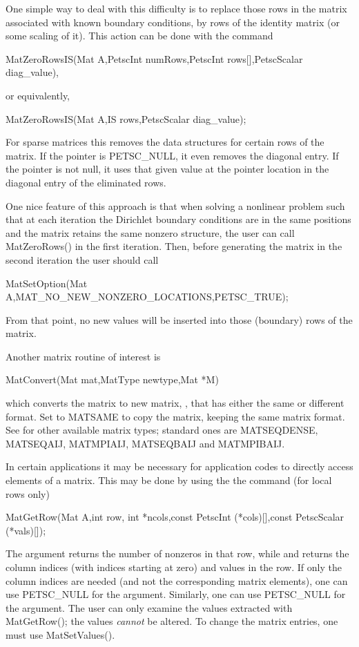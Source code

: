 One simple way to deal with this difficulty is to replace those rows in the 
matrix associated with known boundary conditions, by rows of the 
identity matrix (or some scaling of it). This action can be done with 
the command
\begin{tabbing}
  MatZeroRowsIS(Mat A,PetscInt numRows,PetscInt rows[],PetscScalar diag\_value),
\end{tabbing}
or equivalently,
\begin{tabbing}
  MatZeroRowsIS(Mat A,IS rows,PetscScalar diag\_value);
\end{tabbing}
For sparse matrices this removes the data structures for certain rows 
of the matrix. If the pointer  is PETSC_NULL, it 
even removes the diagonal entry. If the pointer is not null, it uses that 
given value at the pointer location 
in the diagonal entry of the eliminated rows. 

One nice feature of this approach is that when solving a nonlinear problem 
such that at each iteration the Dirichlet boundary conditions are in the 
same positions and the matrix retains the same nonzero structure, the user 
can call MatZeroRows() in the first iteration. Then, before generating 
the matrix in the second iteration the user should call
\begin{tabbing}
  MatSetOption(Mat A,MAT\_NO\_NEW\_NONZERO\_LOCATIONS,PETSC_TRUE);
\end{tabbing}
From that point,
no new values will be inserted into those (boundary) rows of 
the matrix.  

Another matrix routine of interest is
\begin{tabbing}
  MatConvert(Mat mat,MatType newtype,Mat *M)
\end{tabbing}
which converts the matrix  to new matrix, , that has
either the same or different format.  Set  to MATSAME
to copy the matrix, keeping the same matrix format.  See 
 for other available matrix types;
standard ones are MATSEQDENSE, MATSEQAIJ, MATMPIAIJ, 
               MATSEQBAIJ and MATMPIBAIJ.

In certain applications it may be necessary for application codes
to directly access elements of a matrix. This may be done by using the 
the command (for local rows only)
\begin{tabbing}
  MatGetRow(Mat A,int row, int *ncols,const PetscInt (*cols)[],const PetscScalar (*vals)[]);
\end{tabbing}
The argument  returns the number of nonzeros in that row, 
while  and  returns the column indices (with indices
starting at zero) and values in the row. If only the column 
indices are needed (and not the corresponding matrix elements), one
can use PETSC_NULL for the  argument. Similarly,
one can use PETSC_NULL for the  argument.
The user can only examine the values extracted with MatGetRow();
the values {\em cannot} be altered. 
To change the matrix entries, one must use MatSetValues().


